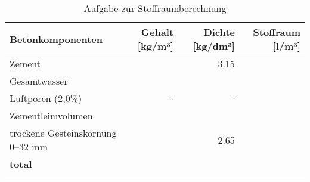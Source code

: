 \begin{questions}
    \begin{table}[h]
        \centering
        \caption{Aufgabe zur Stoffraumberechnung}
        \begin{tabular}{lrrr}
        \toprule
        \textbf{Betonkomponenten}       & \textbf{Gehalt [kg/m³]} & \textbf{Dichte [kg/dm³]} & \textbf{Stoffraum [l/m³]} \\ 
        \midrule
        Zement                           & {}                      & 3.15                       &    {}          \\
        Gesamtwasser                     & {}                      & {}                       & {}            \\
        Luftporen (2,0\%)                & -                        & -                         & {}              \\
        Zementleimvolumen                &                          &                           &                           \\
        trockene Gesteinskörnung 0–32 mm & {}                     & 2.65                       & {}             \\
        \textbf{total}                   & {}           &            {}               & {}             \\
        \bottomrule
        \label{tab:Stoffraumberechnung}
        \end{tabular}
        \end{table}

\end{questions}





